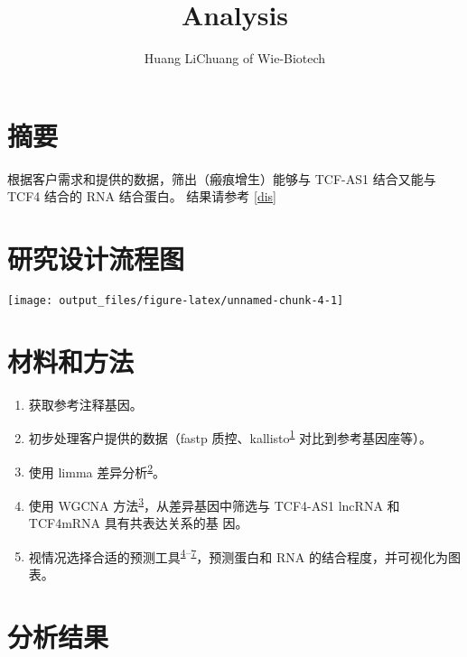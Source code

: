 \documentclass[
]{article}
\title{Analysis}
\author{Huang LiChuang of Wie-Biotech}
\date{}
\providecommand{\tightlist}{%
  \setlength{\itemsep}{0pt}\setlength{\parskip}{0pt}}
\begin{document}
\maketitle

{
\setcounter{tocdepth}{3}
\tableofcontents
}
\listoffigures

\listoftables

\hypertarget{abstract}{%
\section{摘要}\label{abstract}}

根据客户需求和提供的数据，筛出（瘢痕增生）能够与 TCF-AS1 结合又能与 TCF4 结合的 RNA 结合蛋白。
结果请参考 \ref{dis}

\hypertarget{route}{%
\section{研究设计流程图}\label{route}}

\texttt{[image: output\_files/figure-latex/unnamed-chunk-4-1]}

\hypertarget{methods}{%
\section{材料和方法}\label{methods}}

\begin{enumerate}
\def\labelenumi{\arabic{enumi}.}
\tightlist
\item
  获取参考注释基因。
\item
  初步处理客户提供的数据（fastp 质控、kallisto\textsuperscript{\protect\hyperlink{ref-NearOptimalPrBray2016}{1}} 对比到参考基因座等）。
\item
  使用 limma 差异分析\textsuperscript{\protect\hyperlink{ref-LimmaPowersDiRitchi2015}{2}}。
\item
  使用 WGCNA 方法\textsuperscript{\protect\hyperlink{ref-WgcnaAnRPacLangfe2008}{3}}，从差异基因中筛选与 TCF4-AS1 lncRNA 和 TCF4mRNA 具有共表达关系的基
  因。
\item
  视情况选择合适的预测工具\textsuperscript{\protect\hyperlink{ref-ICatIRapidArmaos2021}{4}--\protect\hyperlink{ref-RckAccurateAOrenst2016}{7}}，预测蛋白和 RNA 的结合程度，并可视化为图表。
\end{enumerate}

\hypertarget{results}{%
\section{分析结果}\label{results}}
\end{document}
